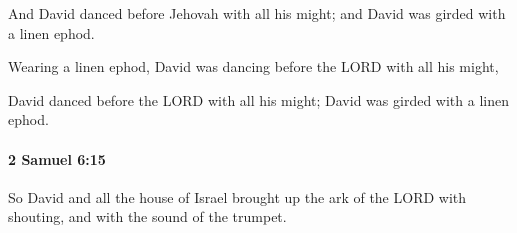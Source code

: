 			\begin{versebox}
					\item[BHS] 
					\item[ASV] And David danced before Jehovah with all his might; and David was girded with a linen ephod.
					\item[NIV] Wearing a linen ephod, David was dancing before the LORD with all his might,
					\item[NRSV] David danced before the LORD with all his might; David was girded with a linen ephod.
			\end{versebox}

		\paragraph{2 Samuel 6:15} %
			\label{2SAMUEL-6-15}

			So David and all the house of Israel brought up the ark of the LORD with shouting, and with the sound of the trumpet.

